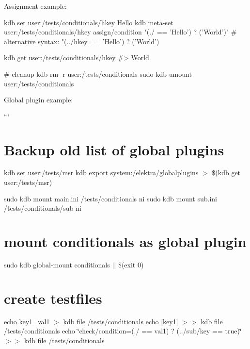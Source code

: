 Assignment example\+:


\begin{DoxyCode}
kdb set user:/tests/conditionals/hkey Hello
kdb meta-set user:/tests/conditionals/hkey assign/condition "(./ == 'Hello') ? ('World')"
# alternative syntax: "(../hkey == 'Hello') ? ('World')

kdb get user:/tests/conditionals/hkey
#> World

# cleanup
kdb rm -r user:/tests/conditionals
sudo kdb umount user:/tests/conditionals
\end{DoxyCode}


Global plugin example\+:

``` \hypertarget{autotoc_md84_autotoc_md93}{}\section{Backup old list of global plugins}\label{autotoc_md84_autotoc_md93}
kdb set user\+:/tests/msr  kdb export system\+:/elektra/globalplugins $>$ \$(kdb get user\+:/tests/msr)

sudo kdb mount main.\+ini /tests/conditionals ni sudo kdb mount sub.\+ini /tests/conditionals/sub ni\hypertarget{autotoc_md84_autotoc_md94}{}\section{mount conditionals as global plugin}\label{autotoc_md84_autotoc_md94}
sudo kdb global-\/mount conditionals $\vert$$\vert$ \$(exit 0)\hypertarget{autotoc_md84_autotoc_md95}{}\section{create testfiles}\label{autotoc_md84_autotoc_md95}
echo \textquotesingle{}key1=val1\textquotesingle{} $>$ {\ttfamily kdb file /tests/conditionals} echo \textquotesingle{}\mbox{[}key1\mbox{]}\textquotesingle{} $>$$>$ {\ttfamily kdb file /tests/conditionals} echo \char`\"{}check/condition=(./ == \textquotesingle{}val1\textquotesingle{}) ? (../sub/key == \textquotesingle{}true\textquotesingle{})\char`\"{} $>$$>$ {\ttfamily kdb file /tests/conditionals}

